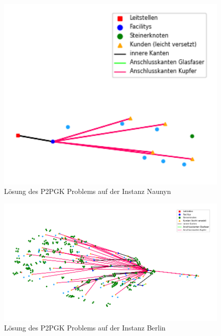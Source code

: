 \documentclass[11pt,a4paper]{article}
\theoremstyle{my_th_style1}
\begin{document}
\begin{figure}[!htbp]
	\begin{center}
		\begin{minipage}{8.0cm}
			\includegraphics[width=1\textwidth]{./Bilder/P2PGK_Naunyn_demand1_duration0}
			\caption{Lösung des P2PGK Problems auf der Instanz Naunyn}
			\label{p2pgk_n_pic}
		\end{minipage}
	\end{center}
\end{figure}

\begin{figure}[!htbp]
	\begin{center}
		\begin{minipage}{15.0cm}
			\includegraphics[width=1\textwidth]{./Bilder/P2PGK_Berlin_demand1_duration0}
			\caption{Lösung des P2PGK Problems auf der Instanz Berlin}
			\label{p2pgk_b_pic}
		\end{minipage}
	\end{center}
\end{figure}
\end{document}
